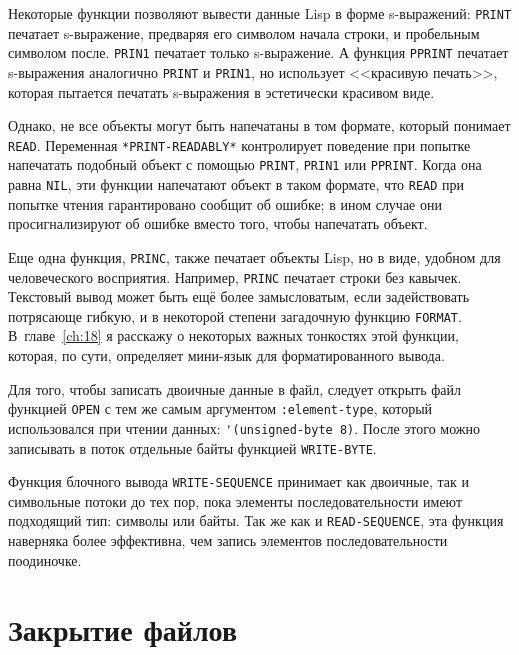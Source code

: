 Некоторые функции позволяют вывести данные Lisp в форме s-выражений: \lstinline{PRINT} печатает
s-выражение, предваряя его символом начала строки, и пробельным символом
после. \lstinline{PRIN1} печатает только s-выражение. А функция \lstinline{PPRINT} печатает
s-выражения аналогично \lstinline{PRINT} и \lstinline{PRIN1}, но использует <<красивую печать>>,
которая пытается печатать s-выражения в эстетически красивом виде.

Однако, не все объекты могут быть напечатаны в том формате, который понимает
\lstinline{READ}. Переменная \lstinline{*PRINT-READABLY*} контролирует поведение при попытке
напечатать подобный объект с помощью \lstinline{PRINT}, \lstinline{PRIN1} или \lstinline{PPRINT}. Когда
она равна \lstinline{NIL}, эти функции напечатают объект в таком формате, что \lstinline{READ} при
попытке чтения гарантировано сообщит об ошибке; в ином случае они просигнализируют об
ошибке вместо того, чтобы напечатать объект.

Еще одна функция, \lstinline{PRINC}, также печатает объекты Lisp, но в виде, удобном для
человеческого восприятия. Например, \lstinline{PRINC} печатает строки без кавычек. Текстовый
вывод может быть ещё более замысловатым, если задействовать потрясающе гибкую, и в
некоторой степени загадочную функцию \lstinline{FORMAT}. В~главе~\ref{ch:18} я расскажу о
некоторых важных тонкостях этой функции, которая, по сути, определяет мини-язык для
форматированного вывода.

Для того, чтобы записать двоичные данные в файл, следует открыть файл функцией \lstinline{OPEN}
с тем же самым аргументом \lstinline{:element-type}, который использовался при чтении данных:
\lstinline{'(unsigned-byte 8)}. После этого можно записывать в поток отдельные байты функцией
\lstinline{WRITE-BYTE}.

Функция блочного вывода \lstinline{WRITE-SEQUENCE} принимает как двоичные, так и символьные
потоки до тех пор, пока элементы последовательности имеют подходящий тип: символы или
байты. Так же как и \lstinline{READ-SEQUENCE}, эта функция наверняка более эффективна, чем
запись элементов последовательности поодиночке.

\section{Закрытие файлов}

